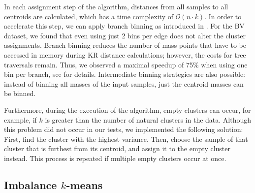 In each assignment step of the algorithm, distances from all samples to all centroids are calculated,
which has a time complexity of $\mathcal{O}(n \cdot k)$.
In order to accelerate this step, we can apply branch binning
as introduced in .
For the \ac{BV} dataset, we found that even using just \num{2} bins per edge does not alter the cluster assignments.
Branch binning reduces the number of mass points that have to be accessed in memory during KR distance calculations;
however, the costs for tree traversals remain.
Thus, we observed a maximal speedup of 75\% when using one bin per branch,
see  for details.
Intermediate binning strategies are also possible:
instead of binning all masses of the input samples, just the centroid masses can be binned.


Furthermore, during the execution of the algorithm, empty clusters can occur,
for example, if $k$ is greater than the number of natural clusters in the data.
Although this problem did not occur in our tests, we implemented the following solution:
First, find the cluster with the highest variance.
Then, choose the sample of that cluster that is furthest from its centroid,
and assign it to the empty cluster instead.
This process is repeated if multiple empty clusters occur at once.


\subsection{Imbalance \texorpdfstring{$k$-means}{k-means}}
\label{ch:Clustering:sec:Methods:sub:ImbalanceKmeans}

